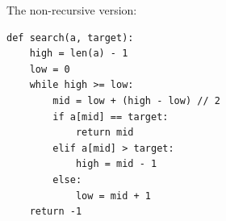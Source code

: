 \documentclass[aspectratio=169, 14pt]{beamer}
\begin{document}
\begin{frame}[fragile]
The non-recursive version:

\begin{verbatim}
def search(a, target):
    high = len(a) - 1
    low = 0
    while high >= low:
        mid = low + (high - low) // 2
        if a[mid] == target:
            return mid
        elif a[mid] > target:
            high = mid - 1
        else:
            low = mid + 1
    return -1
\end{verbatim}
    

\end{frame}
\end{document}
